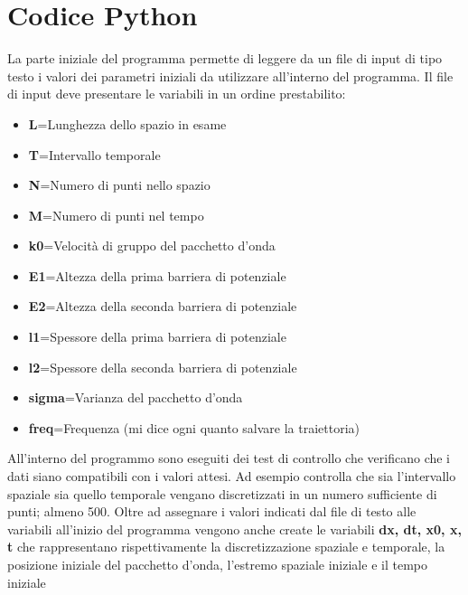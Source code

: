 \documentclass[12pt,onecolumn,a4paper]{memoir}
\begin{document}
\section*{Codice Python}
La parte iniziale del programma permette di leggere da un file di input di tipo testo i valori dei parametri iniziali da utilizzare all'interno del programma. Il file di input deve presentare le variabili in un ordine prestabilito:
\begin{itemize}

\item \textbf {L}=Lunghezza dello spazio in esame

\item \textbf {T}=Intervallo temporale

\item \textbf {N}=Numero di punti nello spazio

\item \textbf {M}=Numero di punti nel tempo

\item \textbf {k0}=Velocità di gruppo del pacchetto d'onda

\item \textbf {E1}=Altezza della prima barriera di potenziale

\item \textbf {E2}=Altezza della seconda barriera di potenziale

\item \textbf {l1}=Spessore della prima barriera di potenziale

\item \textbf {l2}=Spessore della seconda barriera di potenziale

\item \textbf {sigma}=Varianza del pacchetto d'onda

\item \textbf {freq}=Frequenza (mi dice ogni quanto salvare la traiettoria)\newline


\end{itemize}
All'interno del programmo sono eseguiti dei test di controllo che verificano che i dati siano compatibili con i valori attesi.
Ad esempio controlla che sia l'intervallo spaziale sia quello temporale vengano discretizzati in un numero sufficiente di punti; almeno 500.
Oltre ad assegnare i valori indicati dal file di testo alle variabili all'inizio del programma vengono anche create le variabili \textbf {dx, dt, x0, x, t} che rappresentano rispettivamente la discretizzazione spaziale e temporale, la posizione iniziale del pacchetto d'onda, l'estremo spaziale iniziale e il tempo iniziale\newline
\end{document}

